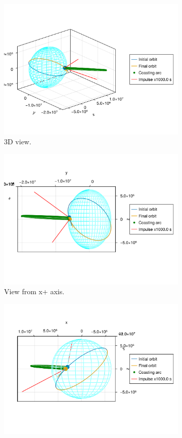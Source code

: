 \begin{figure}[htbp]
    \centering
    \begin{subfigure}{0.49\linewidth}
        \includegraphics[width=0.8\linewidth]{../results/two_body/ipv_noncop/ICI_3d.png}
        \caption{3D view.}
    \end{subfigure}
    \begin{subfigure}{0.49\linewidth}
        \includegraphics[width=0.8\linewidth]{../results/two_body/ipv_noncop/ICI_x+.png}
        \caption{View from x+ axis.}
    \end{subfigure}
    \begin{subfigure}{0.49\linewidth}
        \includegraphics[width=0.8\linewidth]{../results/two_body/ipv_noncop/ICI_y+.png}

\end{subfigure}
\end{figure}
